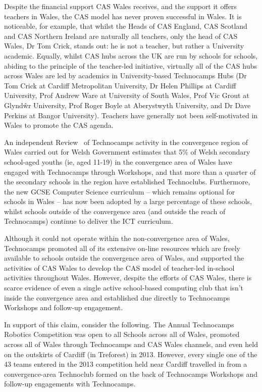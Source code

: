 \documentclass{sig-alternate}
\begin{document}
Despite the financial support CAS Wales receives, and the support it
offers teachers in Wales, the CAS model has never proven successful
in Wales. It is noticeable, for example, that whilst the Heads of
CAS England, CAS Scotland and CAS Northern Ireland are naturally all
teachers, only the head of CAS Wales, Dr Tom Crick, stands out:
he is not a teacher, but rather a University academic.
Equally, whilst CAS hubs across the UK are run by schools
for schools, abiding to the principle of the teacher-led initiative,
virtually all of the CAS hubs across Wales are led by academics
in University-based Technocamps Hubs
(Dr Tom Crick at Cardiff Metropolitan University,
Dr Helen Phillips at Cardiff University,
Prof Andrew Ware at University of South Wales,
Prof Vic Grout at Glynd\^{w}r University,
Prof Roger Boyle at Aberystwyth University,
and Dr Dave Perkins at Bangor University).
Teachers have generally not been self-motivated in Wales
to promote the CAS agenda.

An independent Review~\cite{Wavehill:2015}
of Technocamps activity in the convergence region of Wales
carried out for Welsh Government estimates that
5\% of Welsh secondary school-aged youths (ie, aged 11-19)
in the convergence area of Wales
have engaged with Technocamps through Workshops,
and that
more than a quarter of the secondary schools
in the region have established Technoclubs.
Furthermore, the new GCSE Computer Science curriculum
-- which remains optional for schools in Wales --
has now been adopted by a large percentage of these schools,
whilst schools outside of the convergence area
(and outside the reach of Technocamps) continue
to deliver the ICT curriculum.

Although it could not operate within
the non-convergence area of Wales,
Technocamps promoted all of its extensive on-line resources 
which are freely available to schools outside the convergence area of Wales,
and supported the activities of CAS Wales to develop the CAS model
of teacher-led in-school activities throughout Wales.
However, despite the efforts of CAS Wales,
there is scarce evidence of even a single active school-based
computing club that isn't inside the convergence area and
established due directly to Technocamps Workshops and follow-up engagement.

In support of this claim, consider the following.
The Annual Technocamps Robotics Competition was open to all Schools
across all of Wales, promoted across all of Wales
through Technocamps and CAS Wales channels, and even held
on the outskirts of Cardiff (in Treforest) in 2013.
However, every single one of the 43 teams entered in the 2013
competition held near Cardiff
travelled in from a convergence-area Technoclub formed on the back
of Technocamps Workshops and follow-up engagements with Technocamps.
\end{document}
